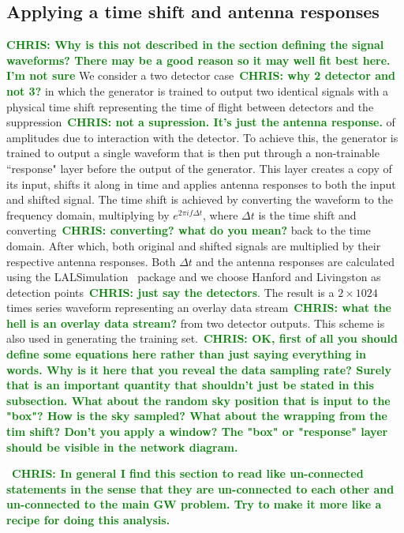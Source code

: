 \documentclass[12pt]{iopart}
\newcommand{\chris}[1]{\textbf{\textcolor{green}{CHRIS: #1}}}
\begin{document}
\subsection{Applying a time shift and antenna responses}

%
\chris{Why is this not described in the section defining the signal waveforms?
There may be a good reason so it may well fit best here. I'm not sure} We
consider a two detector case~\chris{why 2 detector and not 3?} in which the
generator is trained to output two identical signals with a physical time shift
representing the time of flight between detectors and the
suppression~\chris{not a supression. It's just the antenna response.} of
amplitudes due to interaction with the detector. To achieve this, the generator
is trained to output a single waveform that is then put through a non-trainable
``response" layer before the output of the generator. This layer creates a copy
of its input, shifts it along in time and applies antenna responses to both the
input and shifted signal. The time shift is achieved by converting the waveform
to the frequency domain, multiplying by $e^{2 \pi i f \Delta t}$, where $\Delta
t$ is the time shift and converting~\chris{converting? what do you mean?} back
to the time domain. After which, both original and shifted signals are
multiplied by their respective  antenna responses. Both $\Delta t$ and the
antenna responses are calculated using the LALSimulation~\cite{lalsuite}
package and we choose Hanford and Livingston as detection points~\chris{just
say the detectors}. The result is a $2\times 1024$ times series waveform
representing an overlay data stream~\chris{what the hell is an overlay data
stream?} from two detector outputs. This scheme is also used in generating the
training set.~\chris{OK, first of all you should define some equations here
rather than just saying everything in words. Why is it here that you reveal the
data sampling rate? Surely that is an important quantity that shouldn't just be
stated in this subsection. What about the random sky position that is input to
the "box"? How is the sky sampled? What about the wrapping from the tim shift?
Don't you apply a window? The "box" or "response" layer should be visible in
the network diagram.} 

~\chris{In general I find this section to read like un-connected statements in
the sense that they are un-connected to each other and un-connected to the main
GW problem. Try to make it more like a recipe for doing this analysis.}
\end{document}
